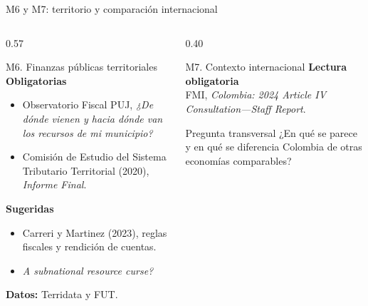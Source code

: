 \documentclass{beamer}
\begin{document}
\begin{frame}{M6 y M7: territorio y comparaci\'on internacional}
\scriptsize
\begin{columns}[T,onlytextwidth]
  \begin{column}{0.57\textwidth}
    \begin{block}{M6. Finanzas p\'ublicas territoriales}
      \textbf{Obligatorias}
      \begin{itemize}
        \item Observatorio Fiscal PUJ, \textit{¿De d\'onde vienen y hacia d\'onde van los recursos de mi municipio?}
        \item Comisi\'on de Estudio del Sistema Tributario Territorial (2020), \textit{Informe Final}.
      \end{itemize}
      \textbf{Sugeridas}
      \begin{itemize}
        \item Carreri y Martinez (2023), reglas fiscales y rendici\'on de cuentas.
        \item \textit{A subnational resource curse?}
      \end{itemize}
      \textbf{Datos:} Terridata y FUT.
    \end{block}
  \end{column}
  \begin{column}{0.40\textwidth}
    \begin{block}{M7. Contexto internacional}
      \textbf{Lectura obligatoria}\\[0.15cm]
      FMI, \textit{Colombia: 2024 Article IV Consultation---Staff Report}.
    \end{block}
    \begin{alertblock}{Pregunta transversal}
      ¿En qu\'e se parece y en qu\'e se diferencia Colombia de otras econom\'ias comparables?
    \end{alertblock}
  \end{column}
\end{columns}
\end{frame}
\end{document}
